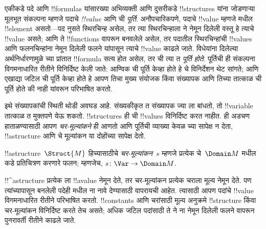 \documentclass[../../../include/open-logic-section]{subfiles}
\begin{document}


\begin{explain}
एकीकडे पदे आणि !!{formula}s यांसारख्या अभिव्यक्ती आणि दुसरीकडे
!!{structure}s यांना जोडणाऱ्या मूलभूत संकल्पना म्हणजे पदाचे
\emph{!!{value}} आणि ची \emph{पूर्ति}. अनौपचारिकपणे,
पदाचे !!{value} म्हणजे मधील !!{element} असतो---पद
नुसते स्थिरचिन्ह असेल, तर त्या स्थिरचिन्हाला ने नेमून
दिलेली वस्तू हे त्याचे !!{value} असते; आणि ते !!{function}s वापरून
बनवलेले असेल, तर पदातील स्थिरचिन्हांची !!{value}s आणि फलनचिन्हांना
नेमून दिलेली फलने यांपासून त्याचे !!{value} काढले जाते. विधेयांना
दिलेल्या अर्थनिर्धारणामुळे च्या प्रांतात !!{formula} सत्य
होत असेल, तर ची त्या त \emph{पूर्ति
होते}. पूर्तिची ही संकल्पना विगमनाधारित रीतीने विनिर्दिष्ट केली जाते:
आण्विक ची पूर्ति केव्हा होते हे चे
विनिर्देशन थेट सांगते; आणि एखाद्या जटिल ची पूर्ति केव्हा
होते हे आपण तिचा मुख्य संयोजक किंवा संख्यापक आणि तिच्या तात्काळ
ची पूर्ति होते की नाही यांवरून परिभाषित करतो.

इथे संख्यापकांची स्थिती थोडी अवघड आहे. संख्यकीकृत
त संख्यापक ज्या ला बांधतो,
तो !!{variable} तात्काळ त मुक्तपणे येऊ शकतो.
!!{structure}s ही ची !!{value}s विनिर्दिष्ट करत नाहीत.
ही अडचण हाताळण्यासाठी आपण \emph{चर-मूल्यांकने} ही आणतो आणि पूर्तिची
व्याख्या केवळ च्या सापेक्ष न देता, !!a{structure} आणि
चे मूल्यांकन या दोहोंच्या सापेक्ष देतो.
\end{explain}

\begin{defn}[चर-मूल्यांकन]
!!a{structure}~$\Struct{M}$ हिच्यासाठीचे \emph{चर-मूल्यांकन}~$s$
म्हणजे प्रत्येक चे~$\Domain M$ मधील कडे
प्रतिचित्रण करणारे फलन; म्हणजेच, $s\colon \Var \to \Domain M$.
\end{defn}

\begin{explain}
!!^a{structure} प्रत्येक ला !!a{value} नेमून देते, तर
चर-मूल्यांकन प्रत्येक चराला मूल्य नेमून देते. पण त्यांच्यापासून बनलेली
पदेही मधील ना नावे देण्यासाठी वापरायची आहेत.
त्यासाठी आपण पदांचे !!{value} विगमनाधारित रीतीने परिभाषित करतो.
!!{constant}s आणि चरांसाठी मूल्य अनुक्रमे !!{structure} किंवा
चर-मूल्यांकन विनिर्दिष्ट करते तेच असते; अधिक जटिल पदांसाठी ते
ने ना नेमून दिलेली फलने वापरून पुनरावर्ती
रीतीने काढले जाते.
\end{explain}
\end{document}
